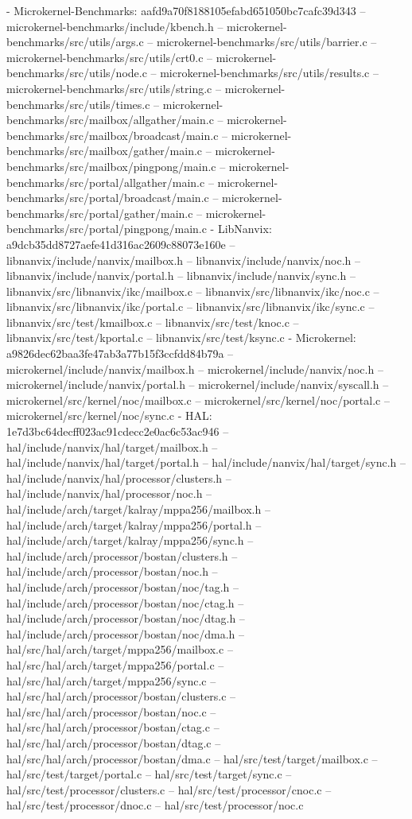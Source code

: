 - Microkernel-Benchmarks: aafd9a70f8188105efabd651050bc7cafc39d343
-- microkernel-benchmarks/include/kbench.h
-- microkernel-benchmarks/src/utils/args.c
-- microkernel-benchmarks/src/utils/barrier.c
-- microkernel-benchmarks/src/utils/crt0.c
-- microkernel-benchmarks/src/utils/node.c
-- microkernel-benchmarks/src/utils/results.c
-- microkernel-benchmarks/src/utils/string.c
-- microkernel-benchmarks/src/utils/times.c
-- microkernel-benchmarks/src/mailbox/allgather/main.c
-- microkernel-benchmarks/src/mailbox/broadcast/main.c
-- microkernel-benchmarks/src/mailbox/gather/main.c
-- microkernel-benchmarks/src/mailbox/pingpong/main.c
-- microkernel-benchmarks/src/portal/allgather/main.c
-- microkernel-benchmarks/src/portal/broadcast/main.c
-- microkernel-benchmarks/src/portal/gather/main.c
-- microkernel-benchmarks/src/portal/pingpong/main.c
- LibNanvix: a9dcb35dd8727aefe41d316ac2609c88073e160e
-- libnanvix/include/nanvix/mailbox.h
-- libnanvix/include/nanvix/noc.h
-- libnanvix/include/nanvix/portal.h
-- libnanvix/include/nanvix/sync.h
-- libnanvix/src/libnanvix/ikc/mailbox.c
-- libnanvix/src/libnanvix/ikc/noc.c
-- libnanvix/src/libnanvix/ikc/portal.c
-- libnanvix/src/libnanvix/ikc/sync.c
-- libnanvix/src/test/kmailbox.c
-- libnanvix/src/test/knoc.c
-- libnanvix/src/test/kportal.c
-- libnanvix/src/test/ksync.c
- Microkernel: a9826dec62baa3fe47ab3a77b15f3ccfdd84b79a
-- microkernel/include/nanvix/mailbox.h
-- microkernel/include/nanvix/noc.h
-- microkernel/include/nanvix/portal.h
-- microkernel/include/nanvix/syscall.h
-- microkernel/src/kernel/noc/mailbox.c
-- microkernel/src/kernel/noc/portal.c
-- microkernel/src/kernel/noc/sync.c
- HAL: 1e7d3bc64decff023ac91cdecc2e0ac6c53ac946
-- hal/include/nanvix/hal/target/mailbox.h
-- hal/include/nanvix/hal/target/portal.h
-- hal/include/nanvix/hal/target/sync.h
-- hal/include/nanvix/hal/processor/clusters.h
-- hal/include/nanvix/hal/processor/noc.h
-- hal/include/arch/target/kalray/mppa256/mailbox.h
-- hal/include/arch/target/kalray/mppa256/portal.h
-- hal/include/arch/target/kalray/mppa256/sync.h
-- hal/include/arch/processor/bostan/clusters.h
-- hal/include/arch/processor/bostan/noc.h
-- hal/include/arch/processor/bostan/noc/tag.h
-- hal/include/arch/processor/bostan/noc/ctag.h
-- hal/include/arch/processor/bostan/noc/dtag.h
-- hal/include/arch/processor/bostan/noc/dma.h
-- hal/src/hal/arch/target/mppa256/mailbox.c
-- hal/src/hal/arch/target/mppa256/portal.c
-- hal/src/hal/arch/target/mppa256/sync.c
-- hal/src/hal/arch/processor/bostan/clusters.c
-- hal/src/hal/arch/processor/bostan/noc.c
-- hal/src/hal/arch/processor/bostan/ctag.c
-- hal/src/hal/arch/processor/bostan/dtag.c
-- hal/src/hal/arch/processor/bostan/dma.c
-- hal/src/test/target/mailbox.c
-- hal/src/test/target/portal.c
-- hal/src/test/target/sync.c
-- hal/src/test/processor/clusters.c
-- hal/src/test/processor/cnoc.c
-- hal/src/test/processor/dnoc.c
-- hal/src/test/processor/noc.c

